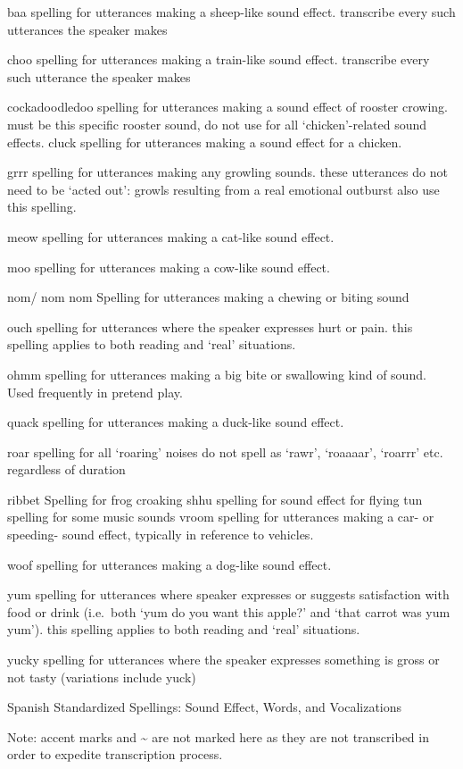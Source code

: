 \documentclass[
  12pt,
]{book}
\begin{document}
baa
spelling for utterances making a sheep-like sound effect. transcribe every such utterances the speaker makes

choo
spelling for utterances making a train-like sound effect. transcribe every such utterance the speaker makes

cockadoodledoo
spelling for utterances making a sound effect of rooster crowing. must be this specific rooster sound, do not use for all `chicken'-related sound effects.
cluck
spelling for utterances making a sound effect for a chicken.

grrr
spelling for utterances making any growling sounds. these utterances do not need to be `acted out': growls resulting from a real emotional outburst also use this spelling.

meow
spelling for utterances making a cat-like sound effect.

moo
spelling for utterances making a cow-like sound effect.

nom/ nom nom
Spelling for utterances making a chewing or biting sound

ouch
spelling for utterances where the speaker expresses hurt or pain. this spelling applies to both reading and `real' situations.

ohmm
spelling for utterances making a big bite or swallowing kind of sound. Used frequently in pretend play.

quack
spelling for utterances making a duck-like sound effect.

roar
spelling for all `roaring' noises
do not spell as `rawr', `roaaaar', `roarrr' etc. regardless of duration

ribbet
Spelling for frog croaking
shhu
spelling for sound effect for flying
tun
spelling for some music sounds
vroom
spelling for utterances making a car- or speeding- sound effect, typically in reference to vehicles.

woof
spelling for utterances making a dog-like sound effect.

yum
spelling for utterances where speaker expresses or suggests satisfaction with food or drink (i.e.~both `yum do you want this apple?' and `that carrot was yum yum'). this spelling applies to both reading and `real' situations.

yucky
spelling for utterances where the speaker expresses something is gross or not tasty (variations include yuck)

Spanish Standardized Spellings: Sound Effect, Words, and Vocalizations

Note: accent marks and \textasciitilde{} are not marked here as they are not transcribed in order to expedite transcription process.
\end{document}

